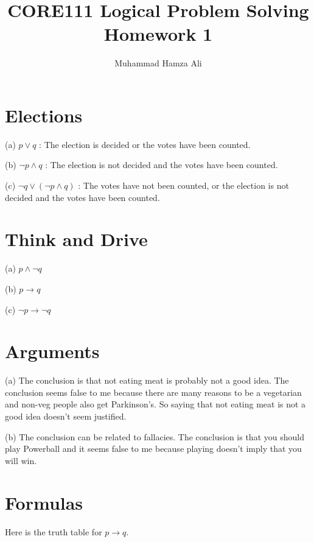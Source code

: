 \documentclass{article}
\title{CORE111 Logical Problem Solving\\Homework 1}
\author{Muhammad Hamza Ali}
\begin{document}
\maketitle

\section{Elections}

(a) $p\vee q$ : The election is decided or the votes have been counted.

(b) $\neg p \wedge q$ : The election is not decided and the votes have been counted.

(c) $\neg q\vee (\neg p \wedge q)$ : The votes have not been counted, or the election is not decided and the votes have been counted.

\section{Think and Drive}

(a) $p \wedge \neg q$

(b) $p \rightarrow q$

(c) $\neg p \rightarrow \neg q$

\section{Arguments}

(a) The conclusion is that not eating meat is probably not a good idea. The conclusion seems false to me because there are many reasons to be a vegetarian and non-veg people also get Parkinson's. So saying that not eating meat is not a good idea doesn't seem justified.

(b) The conclusion can be related to fallacies. The conclusion is that you should play Powerball and it seems false to me because playing doesn't imply that you will win.
\section{Formulas}

Here is the truth table for $p\rightarrow q$.
\end{document}
